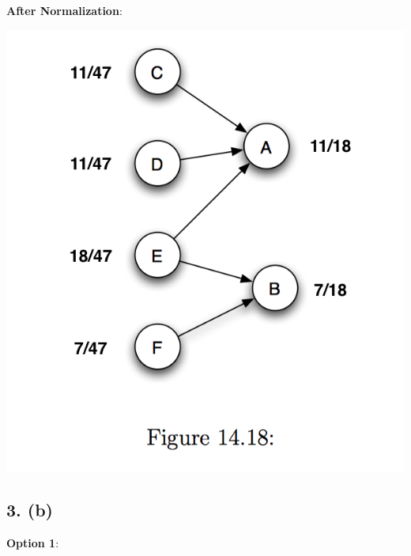 \documentclass[a4paper]{article}
\begin{document}
\textbf{After Normalization}:

\begin{center}
  \includegraphics[scale=0.5]{fig3-norm.png}
\end{center}


\subsection{3. (b)}

\textbf{Option 1}:
\end{document}
